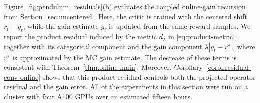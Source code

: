 \documentclass{article}
\begin{document}
Figure~\ref{fig:pendulum_residuals}(b) evaluates the coupled online-gain recursion from Section~\ref{sec:uncentered}. Here, the critic is trained with the centered shift $r_t-g_t$, while the gain estimate $g_t$ is updated from the same reward samples. We report the product residual induced by the metric $d_\lambda$ in \eqref{eq:product-metric}, together with its categorical component and the gain component $\lambda |g_t-\bar r^\pi|$, where $\bar r^\pi$ is approximated by the MC gain estimate. The decrease of these terms is consistent with Theorem~\ref{thm:online-main}. Moreover, Corollary~\ref{corol:residual-conv-online} shows that this product residual controls both the projected-operator residual and the gain error. All of the experiments in this section were run on a cluster with four A100 GPUs over an estimated fifteen hours.
\end{document}
